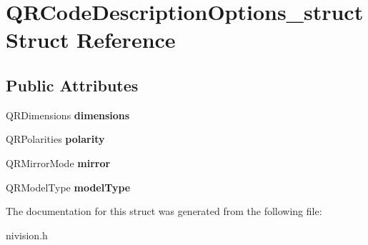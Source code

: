 \hypertarget{structQRCodeDescriptionOptions__struct}{\section{\-Q\-R\-Code\-Description\-Options\-\_\-struct \-Struct \-Reference}
\label{structQRCodeDescriptionOptions__struct}
}
\subsection*{\-Public \-Attributes}
\begin{DoxyCompactItemize}
\item 
\hypertarget{structQRCodeDescriptionOptions__struct_aa7c7e967c6e1e3b3367ff7e78f518d68}{\-Q\-R\-Dimensions {\bfseries dimensions}}\label{structQRCodeDescriptionOptions__struct_aa7c7e967c6e1e3b3367ff7e78f518d68}

\item 
\hypertarget{structQRCodeDescriptionOptions__struct_a69584139380a667876d13334a392c54f}{\-Q\-R\-Polarities {\bfseries polarity}}\label{structQRCodeDescriptionOptions__struct_a69584139380a667876d13334a392c54f}

\item 
\hypertarget{structQRCodeDescriptionOptions__struct_a7864263be3f3c7d7cf3e341eafdfd213}{\-Q\-R\-Mirror\-Mode {\bfseries mirror}}\label{structQRCodeDescriptionOptions__struct_a7864263be3f3c7d7cf3e341eafdfd213}

\item 
\hypertarget{structQRCodeDescriptionOptions__struct_a094c0cbfe0f989f0534a45d89d3172ff}{\-Q\-R\-Model\-Type {\bfseries model\-Type}}\label{structQRCodeDescriptionOptions__struct_a094c0cbfe0f989f0534a45d89d3172ff}

\end{DoxyCompactItemize}


\-The documentation for this struct was generated from the following file\-:\begin{DoxyCompactItemize}
\item 
nivision.\-h\end{DoxyCompactItemize}
